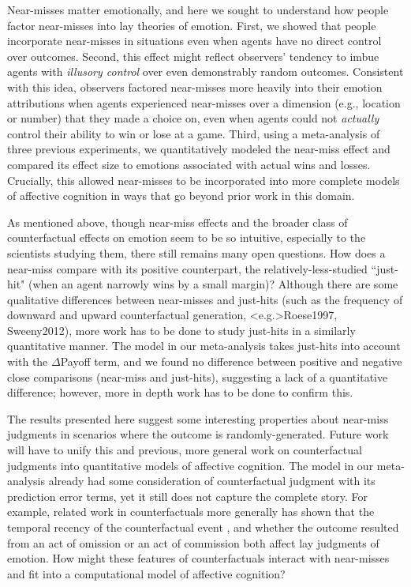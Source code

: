 \documentclass[10pt,letterpaper]{article}
\begin{document}
Near-misses matter emotionally, and here we sought to understand how people factor near-misses into lay theories of emotion. First, we showed that people incorporate near-misses in situations even when agents have no direct control over outcomes. Second, this effect might reflect observers' tendency to imbue agents with \textit{illusory control} over even demonstrably random outcomes.  Consistent with this idea, observers factored near-misses more heavily into their emotion attributions when agents experienced near-misses over a dimension (e.g., location or number) that they made a choice on, even when agents could not \textit{actually} control their ability to win or lose at a game. Third, using a meta-analysis of three previous experiments, we quantitatively modeled the near-miss effect and compared its effect size to emotions associated with actual wins and losses. Crucially, this allowed near-misses to be incorporated into more complete models of affective cognition in ways that go beyond prior work in this domain.


	As mentioned above, though near-miss effects and the broader class of counterfactual effects on emotion seem to be so intuitive, especially to the scientists studying them, there still remains many open questions. How does a near-miss compare with its positive counterpart, the relatively-less-studied ``just-hit" (when an agent narrowly wins by a small margin)? Although there are some qualitative differences between near-misses and just-hits (such as the frequency of downward and upward counterfactual generation, \citeNP<e.g.>{Roese1997, Sweeny2012}), more work has to be done to study just-hits in a similarly quantitative manner. The model in our meta-analysis takes just-hits into account with the $\Delta$Payoff term, and we found no difference between positive and negative close comparisons (near-miss and just-hits), suggesting a lack of a quantitative difference; however, more in depth work has to be done to confirm this.

	The results presented here suggest some interesting properties about near-miss judgments in scenarios where the outcome is randomly-generated. Future work will have to unify this and previous, more general work on counterfactual judgments into quantitative models of affective cognition. The model in our meta-analysis already had some consideration of counterfactual judgment with its prediction error terms, yet it still does not capture the complete story. For example, related work in counterfactuals more generally has shown that the temporal recency of the counterfactual event \cite{Miller1990}, and whether the outcome resulted from an act of omission or an act of commission \cite{Kahneman1982, Landman1987} both affect lay judgments of emotion. How might these features of counterfactuals interact with near-misses and fit into a computational model of affective cognition? 
\end{document}

